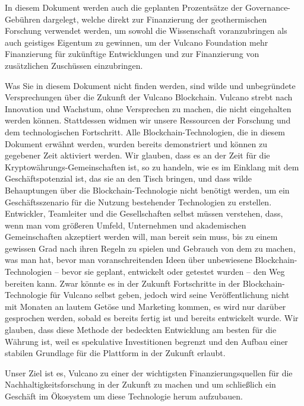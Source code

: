 \documentclass[A4paper, 12pt]{article}
\begin{document}
In diesem Dokument werden auch die geplanten Prozentsätze der Governance-Gebühren dargelegt, welche direkt zur Finanzierung der geothermischen Forschung verwendet werden, um sowohl die Wissenschaft voranzubringen als auch geistiges Eigentum zu gewinnen, um der Vulcano Foundation mehr Finanzierung für zukünftige Entwicklungen und zur Finanzierung von zusätzlichen Zuschüssen einzubringen. 

Was Sie in diesem Dokument nicht finden werden, sind wilde und unbegründete Versprechungen über die Zukunft der Vulcano Blockchain. Vulcano strebt nach Innovation und Wachstum, ohne Versprechen zu machen, die nicht eingehalten werden können. Stattdessen widmen wir unsere Ressourcen der Forschung und dem technologischen Fortschritt. Alle Blockchain-Technologien, die in diesem Dokument erwähnt werden, wurden bereits demonstriert und können zu gegebener Zeit aktiviert werden. Wir glauben, dass es an der Zeit für die Kryptowährungs-Gemeinschaften ist, so zu handeln, wie es im Einklang mit dem Geschäftspotenzial ist, das sie an den Tisch bringen, und dass wilde Behauptungen über die Blockchain-Technologie nicht benötigt werden, um ein Geschäftsszenario für die Nutzung bestehender Technologien zu erstellen. Entwickler, Teamleiter und die Gesellschaften selbst müssen verstehen, dass, wenn man vom größeren Umfeld, Unternehmen und akademischen Gemeinschaften akzeptiert werden will, man bereit sein muss, bis zu einem gewissen Grad nach ihren Regeln zu spielen und Gebrauch von dem zu machen, was man hat, bevor man voranschreitenden Ideen über unbewiesene Blockchain-Technologien – bevor sie geplant, entwickelt oder getestet wurden – den Weg bereiten kann. Zwar könnte es in der Zukunft Fortschritte in der Blockchain-Technologie für Vulcano selbst geben, jedoch wird seine Veröffentlichung nicht mit Monaten an lautem Getöse und Marketing kommen, es wird nur darüber gesprochen werden, sobald es bereits fertig ist und bereits entwickelt wurde. Wir glauben, dass diese Methode der bedeckten Entwicklung am besten für die Währung ist, weil es spekulative Investitionen begrenzt und den Aufbau einer stabilen Grundlage für die Plattform in der Zukunft erlaubt. 

Unser Ziel ist es, Vulcano zu einer der wichtigsten Finanzierungsquellen für die Nachhaltigkeitsforschung in der Zukunft zu machen und um schließlich ein Geschäft im Ökosystem um diese Technologie herum aufzubauen. 
\end{document}
